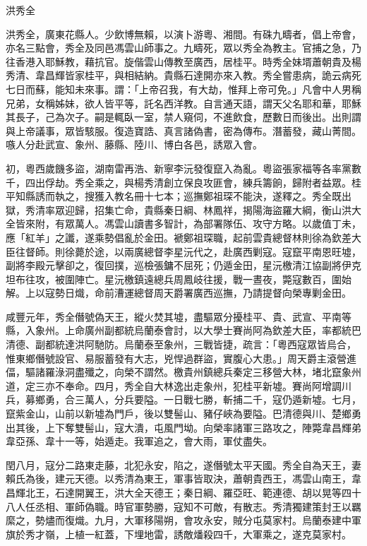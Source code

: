 
\begin{pinyinscope}
洪秀全

洪秀全，廣東花縣人。少飲博無賴，以演卜游粵、湘間。有硃九疇者，倡上帝會，亦名三點會，秀全及同邑馮雲山師事之。九疇死，眾以秀全為教主。官捕之急，乃往香港入耶穌教，藉抗官。旋偕雲山傳教至廣西，居桂平。時秀全妹壻蕭朝貴及楊秀清、韋昌輝皆家桂平，與相結納。貴縣石達開亦來入教。秀全嘗患病，詭云病死七日而蘇，能知未來事。謂：「上帝召我，有大劫，惟拜上帝可免。」凡會中人男稱兄弟，女稱姊妹，欲人皆平等，託名西洋教。自言通天語，謂天父名耶和華，耶穌其長子，己為次子。嗣是輒臥一室，禁人窺伺，不進飲食，歷數日而後出。出則謂與上帝議事，眾皆駭服。復造寶誥、真言諸偽書，密為傳布。潛蓄發，藏山菁間。嗾人分赴武宣、象州、藤縣、陸川、博白各邑，誘眾入會。

初，粵西歲饑多盜，湖南雷再浩、新寧李沅發復竄入為亂。粵盜張家福等各率黨數千，四出俘劫。秀全乘之，與楊秀清創立保良攻匪會，練兵籌餉，歸附者益眾。桂平知縣誘而執之，搜獲入教名冊十七本；巡撫鄭祖琛不能決，遂釋之。秀全既出獄，秀清率眾迎歸，招集亡命，貴縣秦日綱、林鳳祥，揭陽海盜羅大綱，衡山洪大全皆來附，有眾萬人。馮雲山讀書多智計，為部署隊伍、攻守方略。以歲值丁未，應「紅羊」之讖，遂乘勢倡亂於金田。褫鄭祖琛職，起前雲貴總督林則徐為欽差大臣往督師。則徐薨於途，以兩廣總督李星沅代之，赴廣西剿寇。寇竄平南恩旺墟，副將李殿元擊卻之，復回撲，巡檢張鏞不屈死；仍遁金田，星沅檄清江協副將伊克坦布往攻，被圍陣亡。星沅檄鎮遠總兵周鳳岐往援，戰一晝夜，斃寇數百，圍始解。上以寇勢日熾，命前漕運總督周天爵署廣西巡撫，乃請提督向榮專剿金田。

咸豐元年，秀全僭號偽天王，縱火焚其墟，盡驅眾分擾桂平、貴、武宣、平南等縣，入象州。上命廣州副都統烏蘭泰會討，以大學士賽尚阿為欽差大臣，率都統巴清德、副都統達洪阿馳防。烏蘭泰至象州，三戰皆捷，疏言：「粵西寇眾皆烏合，惟東鄉僭號設官、易服蓄發有大志，兇悍過群盜，實腹心大患。」周天爵主滾營進偪，驅諸羅淥洞盡殲之，向榮不謂然。檄貴州鎮總兵秦定三移營大林，堵北竄象州道，定三亦不奉命。四月，秀全自大林逸出走象州，犯桂平新墟。賽尚阿增調川兵，募鄉勇，合三萬人，分兵要隘。一日戰七勝，斬捕二千，寇仍遁新墟。七月，竄紫金山，山前以新墟為門戶，後以雙髻山、豬仔峽為要隘。巴清德與川、楚鄉勇出其後，上下奪雙髻山，寇大潰，屯風門坳。向榮率諸軍三路攻之，陣斃韋昌輝弟韋亞孫、韋十一等，始遁走。我軍追之，會大雨，軍仗盡失。

閏八月，寇分二路東走藤，北犯永安，陷之，遂僭號太平天國。秀全自為天王，妻賴氏為後，建元天德。以秀清為東王，軍事皆取決，蕭朝貴西王，馮雲山南王，韋昌輝北王，石達開翼王，洪大全天德王；秦日綱、羅亞旺、範連德、胡以晃等四十八人任丞相、軍師偽職。時官軍勢勝，寇知不可敵，有散志。秀清獨建策封王以羈縻之，勢燼而復熾。九月，大軍移陽朔，會攻永安，賊分屯莫家村。烏蘭泰建中軍旗於秀才嶺，上植一紅蓋，下埋地雷，誘敵燔殺四千，大軍乘之，遂克莫家村。


\end{pinyinscope}
